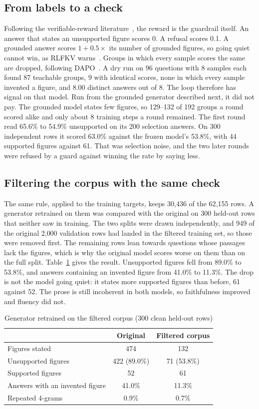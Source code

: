 \documentclass[conference]{IEEEtran}
\begin{document}
\subsection{From labels to a check}
Following the verifiable-reward literature~\cite{lambert2024tulu,dong2023raft}, the reward is the
guardrail itself. An answer that states an unsupported figure scores 0. A refusal scores 0.1. A
grounded answer scores $1 + 0.5 \times$ its number of grounded figures, so going quiet cannot win, as
RLFKV warns~\cite{yin2026rlfkv}. Groups in which every sample scores the same are dropped, following
DAPO~\cite{yu2025dapo}. A dry run on 96 questions with 8 samples each found 87 teachable groups, 9 with
identical scores, none in which every sample invented a figure, and 8.00 distinct answers out of 8.
The loop therefore has signal on that model. Run from the grounded generator described next, it did
not pay. The grounded model states few figures, so 129--132 of 192 groups a round scored alike and
only about 8 training steps a round remained. The first round read 65.6\% to 54.9\% unsupported on
its 200 selection answers. On 300 independent rows it scored 63.0\% against the frozen model's
53.8\%, with 44 supported figures against 61. That was selection noise, and the two later rounds were
refused by a guard against winning the rate by saying less.

\subsection{Filtering the corpus with the same check}
The same rule, applied to the training targets, keeps 30{,}436 of the 62{,}155 rows. A generator
retrained on them was compared with the original on 300 held-out rows that neither saw in
training. The two splits were drawn independently, and 949 of the original 2{,}000 validation rows
had landed in the filtered training set, so those were removed first. The remaining rows lean
towards questions whose passages lack the figures, which is why the original model scores worse on
them than on the full split. Table~\ref{tab:grounded} gives the result. Unsupported figures fell
from 89.0\% to 53.8\%, and answers containing an invented figure from 41.0\% to 11.3\%. The drop
is not the model going quiet: it states more supported figures than before, 61 against 52. The
prose is still incoherent in both models, so faithfulness improved and fluency did not.

\begin{table}[t]
\centering
\caption{Generator retrained on the filtered corpus (300 clean held-out rows)}
\label{tab:grounded}
\begin{tabular}{@{}lcc@{}}
\toprule
 & Original & Filtered corpus \\
\midrule
Figures stated & 474 & 132 \\
Unsupported figures & 422 (89.0\%) & 71 (53.8\%) \\
Supported figures & 52 & 61 \\
Answers with an invented figure & 41.0\% & 11.3\% \\
Repeated 4-grams & 0.9\% & 0.7\% \\
\bottomrule
\end{tabular}
\end{table}
\end{document}
